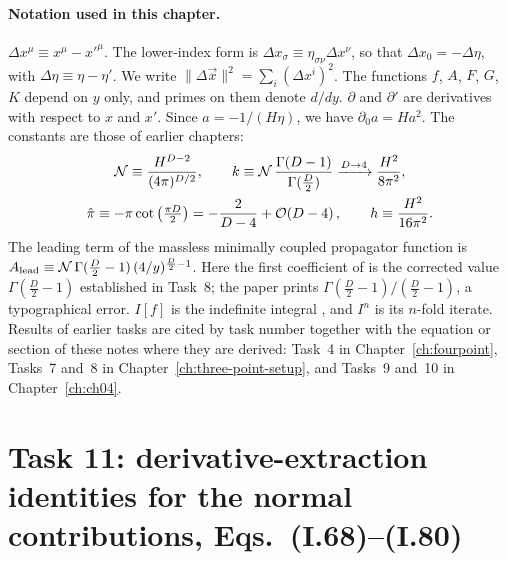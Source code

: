 \paragraph{Notation used in this chapter.}
$\Delta x^\mu\equiv x^\mu-x'^\mu$. The lower-index form is $\Delta x_\sigma\equiv\eta_{\sigma\nu}\Delta x^\nu$, so that $\Delta x_0=-\Delta\eta$, with $\Delta\eta\equiv\eta-\eta'$.
We write $\|\Delta\vec x\|^2=\sum_i(\Delta x^i)^2$. The functions $f$, $A$, $F$, $G$, $K$ depend on $y$ only, and primes on them denote $d/dy$.
$\partial$ and $\partial'$ are derivatives with respect to $x$ and $x'$. Since $a=-1/(H\eta)$, we have $\partial_0a=Ha^2$.
The constants are those of earlier chapters:
\begin{equation*}
\begin{gathered}
\mathcal N\equiv\frac{H^{D-2}}{(4\pi)^{D/2}},\qquad
k\equiv\mathcal N\,\frac{\Gamma(D-1)}{\Gamma(\frac D2)}\xrightarrow{D\to4}\frac{H^2}{8\pi^2},\\
\hat\pi\equiv-\pi\cot\big(\tfrac{\pi D}{2}\big)=-\frac{2}{D-4}+\mathcal{O}\!\left(D-4\right),\qquad
h\equiv\frac{H^2}{16\pi^2}.
\end{gathered}
\end{equation*}
The leading term of the massless minimally coupled propagator function is
$A_{\rm lead}\equiv\mathcal N\,\Gamma(\tfrac D2-1)\,(4/y)^{\frac D2-1}$. Here the first coefficient of  is the corrected value
$\Gamma(\frac D2-1)$ established in Task~8; the paper prints $\Gamma(\frac D2-1)/(\frac D2-1)$, a typographical error.
$I[f]$ is the indefinite integral , and $I^n$ is its $n$-fold iterate.
Results of earlier tasks are cited by task number together with the equation or section of these notes where they are derived: Task~4 in Chapter~\ref{ch:fourpoint}, Tasks~7 and~8 in Chapter~\ref{ch:three-point-setup}, and Tasks~9 and~10 in Chapter~\ref{ch:ch04}.

\section[Task 11: derivative-extraction identities, Eqs. (I.68)--(I.80)]{Task 11: derivative-extraction identities for the normal contributions, Eqs.~(I.68)--(I.80)}
\label{sec:ch05:t11}

